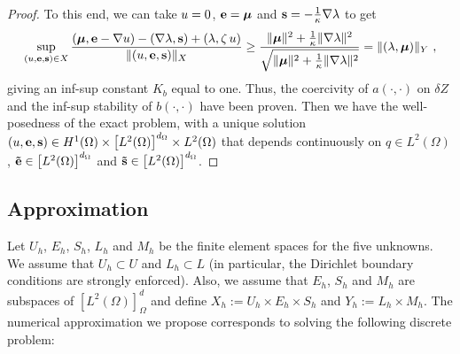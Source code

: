 \begin{theorem}[Uniqueness]
\begin{proof}
		To this end, we can take $u=0$, $\mathbf{e}=\boldsymbol{\mu}$ and $\mathbf{s}=-\frac{1}{\kappa}\nabla \lambda$ to get
		\begin{equation*}
			\sup_{(u,\mathbf{e},\mathbf{s})\in X} \frac{\left (\boldsymbol{\mu},\mathbf{e}-\nabla u \right ) - \left (\nabla \lambda, \mathbf{s} \right ) + \left ( \lambda, \zeta\,u \right )}{\|(u,\mathbf{e},\mathbf{s})\|_X} 
			\geq \frac{\|\boldsymbol{\mu}\|^2 + \frac{1}{\kappa}\|\nabla \lambda\|^2}{\sqrt{\|\boldsymbol{\mu}\|^2 + \frac{1}{\kappa}\|\nabla \lambda \|^2}} = \|(\lambda,\boldsymbol{\mu})\|_Y~,
		\end{equation*}
		giving an inf-sup constant $K_b$ equal to one. Thus, the coercivity of $a(\cdot,\cdot)$ on $\delta Z$ and the inf-sup stability of $b(\cdot,\cdot)$ have been proven. Then we have the well-posedness of the exact problem, with a unique solution $(u,\mathbf{e},\mathbf{s})\in H^1(\Omega) \times \left[L^2(\Omega)\right]^{d_{\Omega}} \times L^2(\Omega)$ that depends continuously on $q\in L^2(\Omega)$, $\mathbf{\tilde{e}} \in \left[L^2(\Omega)\right]^{d_{\Omega}}$ and $\mathbf{\tilde{s}} \in \left[L^2(\Omega)\right]^{d_{\Omega}}$.
	\end{proof}
\end{theorem}


\subsection{Approximation}

Let $U_h$, $E_h$, $S_h$, $L_h$ and $M_h$ be the finite element spaces for the five unknowns. We assume that $U_h\subset U$ and $L_h\subset L$ (in particular, the Dirichlet boundary conditions are strongly enforced). 
Also, we assume that $E_h$, $S_h$ and $M_h$ are subspaces of $[L^2(\Omega)]^d_{\Omega}$ and define $X_h:=U_h\times E_h \times S_h$ and $Y_h:=L_h\times M_h$. The numerical approximation we propose corresponds to solving the following discrete problem:

